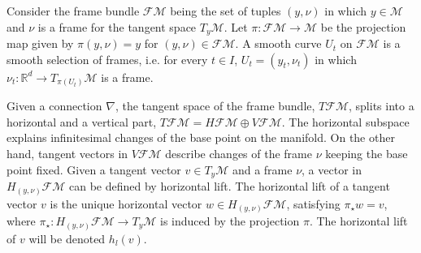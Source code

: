 \documentclass[runningheads,a4paper]{llncs}
\newcommand{\R}{\mathbb R}
\newcommand{\M}{\mathcal{M}}
\newcommand{\FM}{\mathcal{FM}}
\begin{document}
 Consider the frame bundle $\mathcal{FM}$ being the set of tuples $(y,\nu)$ in which $y\in\M$ and $\nu$ is a frame for the tangent space $T_y\M$. Let $\pi\colon\mathcal{FM}\to\mathcal{M}$ be the projection map given by $\pi(y,\nu) = y$ for $(y,\nu)\in\FM$. A smooth curve $U_t$ on $\FM$ is a smooth selection of frames, i.e. for every $t\in I$, $U_t = (y_t,\nu_t)$ in which $\nu_t\colon\R^d\to T_{\pi(U_t)}\mathcal{M}$ is a frame.

 Given a connection $\nabla$, the tangent space of the frame bundle, $T\FM$, splits into a horizontal and a vertical part, $T\FM = H\FM\oplus V\FM$. The horizontal subspace explains infinitesimal changes of the base point on the manifold. On the other hand, tangent vectors in $V\FM$ describe changes of the frame $\nu$ keeping the base point fixed. Given a tangent vector $v\in T_y\mathcal{M}$ and a frame $\nu$, a vector in $H_{(y,\nu)}\FM$ can be defined by horizontal lift. The horizontal lift of a tangent vector $v$ is the unique horizontal vector $w\in H_{(y,\nu)}\FM$, satisfying $\pi_\star w = v$, where $\pi_\star\colon H_{(y,\nu)}\mathcal{FM}\to T_y\mathcal{M}$ is induced by the projection $\pi$. The horizontal lift of $v$ will be denoted $h_l(v)$.
\end{document}
